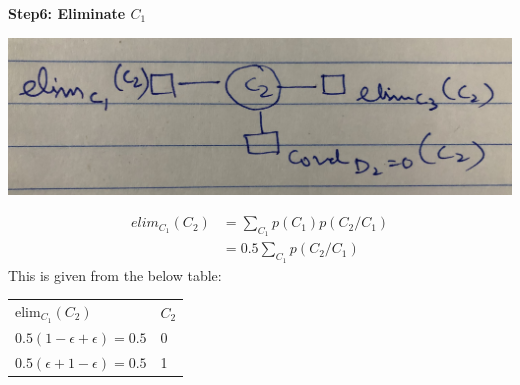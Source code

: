 \documentclass[12pt]{article}
\begin{document}
\begin{enumerate}[label=(\alph*)]
  
  \textbf{Step6: Eliminate $C_1$} \\
  \begin{center}
  \includegraphics[scale=0.1]{IMG_2283.jpg}
  \end{center}
  \begin{align*}
	elim_{C_1}(C_2) &= \sum_{C_1} p(C_1) p(C_2/C_1) \\
	&= 0.5 \sum_{C_1} p(C_2/C_1)
  \end{align*}
  This is given from the below table:
  \begin{center}
  \begin{tabular}{ll}
  elim$_{C_1}(C_2)$ & $C_2$  \\
  $0.5(1-\epsilon + \epsilon) = 0.5$            & 0       \\
  $0.5(\epsilon + 1-\epsilon) = 0.5$               & 1       \\
  \end{tabular} \newline \\
  \end{center}
  

\end{enumerate}
\end{document}
